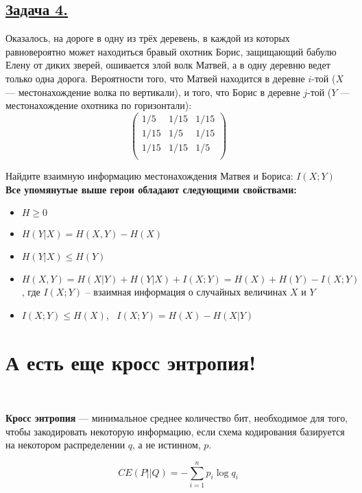 \subsection*{\hyperref[sec:sol_problem4]{Задача 4.}}\label{sec:problem4}  Оказалось, на дороге в одну из трёх деревень, в каждой из которых равновероятно может находиться бравый охотник Борис, защищающий бабулю Елену от диких зверей, ошивается злой волк Матвей, а в одну деревню ведет только одна дорога. Вероятности того, что Матвей находится в деревне $i$-той ($X$ --- местонахождение волка по вертикали), и того, что Борис в деревне $j$-той ($Y$ --- местонахождение охотника по горизонтали):
\[\begin{pmatrix}
    1/5 & 1/15 & 1/15 \\
    1/15 & 1/5 & 1/15 \\
    1/15 & 1/15 & 1/5 \\
\end{pmatrix} \]

Найдите взаимную информацию местонахождения Матвея и Бориса: $I(X; Y)$
\\

\textbf{Все упомянутые выше герои обладают следующими свойствами:}

\begin{itemize}
	\item $H \geqslant 0$
	\item $H(Y|X)=H(X, Y)-H(X)$ 
	\item $H(Y|X)\leqslant H(Y)$
	\item $H(X, Y)=H(X|Y)+H(Y|X)+I(X; Y)=H(X)+H(Y)-I(X; Y)$, где $I(X; Y)$ -- взаимная информация о случайных величинах $X$ и $Y$
	\item $I(X; Y)\leqslant H(X)$, \ $I(X; Y)=H(X)-H(X|Y)$
\end{itemize}

\section*{А есть еще кросс энтропия!}~\
\\

\begin{siderules}
    \textbf{Кросс энтропия} --- минимальное среднее количество бит, необходимое для того, чтобы закодировать некоторую информацию, если схема кодирования базируется на некотором распределении $q$, а не истинном, $p$.
\end{siderules}

\[CE(P||Q)=-\sum\limits_{i=1}^{n}p_i\log q_i \]

